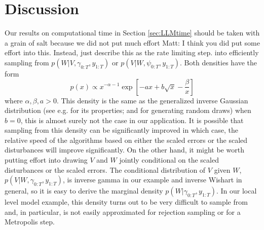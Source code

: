 \documentclass{article}
\newcommand{\matt}[1]{{\color{red} Matt: #1}}
\begin{document}
\section{Discussion}\label{sec:Discussion}
Our results on computational time in Section \ref{sec:LLMtime} should be taken with a grain of salt because we did not put much effort \matt{I think you did put some effort into this. Instead, just describe this as the rate limiting step.} into efficiently sampling from $p(W|V,\gamma_{0:T},y_{1:T})$ or $p(V|W,\psi_{0:T},y_{1:T})$. Both densities have the form
\[
p(x)\propto x^{-\alpha-1}\exp\left[-ax + b\sqrt{x} - \frac{\beta}{x}\right]
\]
where $\alpha,\beta,a>0$. This density is the same as the generalized inverse Gaussian distribution (see e.g. \citet{jorgensen1982statistical} for its properties; \citet{dagpunar1989easily} and \citet{devroye2012random} for generating random draws) when $b=0$, this is almost surely not the case in our application. It is possible that sampling from this density can be significantly improved in which case, the relative speed of the algorithms based on either the scaled errors or the scaled disturbances will improve significantly. On the other hand, it might be worth putting effort into drawing $V$ and $W$ jointly conditional on the scaled disturbances or the scaled errors. The conditional distribution of $V$ given $W$, $p(V|W,\gamma_{0:T},y_{1:T})$, is inverse gamma in our example and inverse Wishart in general, so it is easy to derive the marginal density $p(W|\gamma_{0:T},y_{1:T})$. In our local level model example, this density turns out to be very difficult to sample from and, in particular, is not easily approximated for rejection sampling or for a Metropolis step. 
\end{document}
